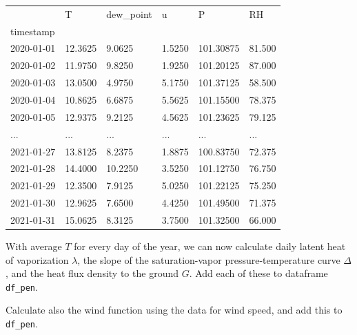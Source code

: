 \documentclass[
  letterpaper,
  DIV=11,
  numbers=noendperiod]{scrreprt}
\begin{document}
\begin{longtable}[]{@{}llllll@{}}
\toprule()
& T & dew\_point & u & P & RH \\
timestamp & & & & & \\
\midrule()
\endhead
2020-01-01 & 12.3625 & 9.0625 & 1.5250 & 101.30875 & 81.500 \\
2020-01-02 & 11.9750 & 9.8250 & 1.9250 & 101.20125 & 87.000 \\
2020-01-03 & 13.0500 & 4.9750 & 5.1750 & 101.37125 & 58.500 \\
2020-01-04 & 10.8625 & 6.6875 & 5.5625 & 101.15500 & 78.375 \\
2020-01-05 & 12.9375 & 9.2125 & 4.5625 & 101.23625 & 79.125 \\
... & ... & ... & ... & ... & ... \\
2021-01-27 & 13.8125 & 8.2375 & 1.8875 & 100.83750 & 72.375 \\
2021-01-28 & 14.4000 & 10.2250 & 3.5250 & 101.12750 & 76.750 \\
2021-01-29 & 12.3500 & 7.9125 & 5.0250 & 101.22125 & 75.250 \\
2021-01-30 & 12.9625 & 7.6500 & 4.4250 & 101.49500 & 71.375 \\
2021-01-31 & 15.0625 & 8.3125 & 3.7500 & 101.32500 & 66.000 \\
\bottomrule()
\end{longtable}

With average \(T\) for every day of the year, we can now calculate daily
latent heat of vaporization \(\lambda\), the slope of the
saturation-vapor pressure-temperature curve \(\Delta\), and the heat
flux density to the ground \(G\). Add each of these to dataframe
\texttt{df\_pen}.

Calculate also the wind function using the data for wind speed, and add
this to \texttt{df\_pen}.
\end{document}
